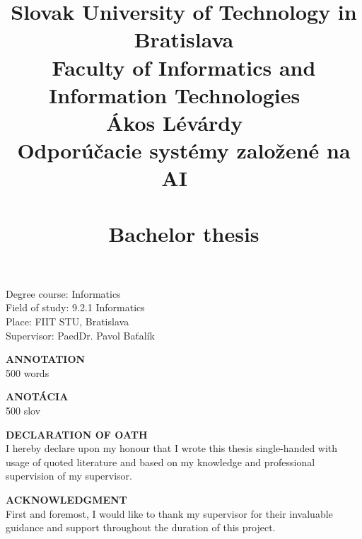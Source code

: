 \documentclass[10pt,oneside,english,a4paper]{article}
\title{\Large \textbf{Slovak University of Technology in Bratislava\\
Faculty of Informatics and Information Technologies} \ \\ \vspace{4\baselineskip} \Large{ Ákos
Lévárdy } \ \\ \LARGE{ Odporúčacie systémy založené na AI } \ \\ \ \\ \large{
Bachelor thesis} }
\begin{document}
 
\maketitle
\thispagestyle{empty}
\vspace{7\baselineskip} 		%
\hspace{-2cm} 			%
\parbox{0.8\textwidth}{ 
\raggedright 			%

\Large Degree course: Informatics\\ 
Field of study: 9.2.1 Informatics\\ 
Place: FIIT STU, Bratislava\\ 
Supervisor: PaedDr. Pavol Baťalík \\}



{}
\newpage{} 
\setcounter{page}{2}

\hspace{-2cm} \Large \textbf{ANNOTATION}\\
500 words

\newpage{}
\setcounter{page}{3}

\hspace{-2cm} \Large \textbf{ANOTÁCIA}\\ 
500 slov 


\newpage{} 		%
\setcounter{page}{4}
\vspace*{\fill}
\noindent \Large \textbf{DECLARATION OF OATH}\\
\noindent I hereby declare upon my honour that I wrote this thesis single-handed with usage of quoted literature and based on my knowledge and professional supervision of my supervisor.
\vspace*{\fill} 
\vspace{-8cm} 



\newpage 			%
\setcounter{page}{5}
\vspace*{\fill} 
\noindent \Large \textbf{ ACKNOWLEDGMENT}\\
\noindent First and foremost, I would like to thank my supervisor for their invaluable guidance and support throughout the duration of this project.
\vspace*{\fill} 
\vspace{-8cm} 
\end{document}

